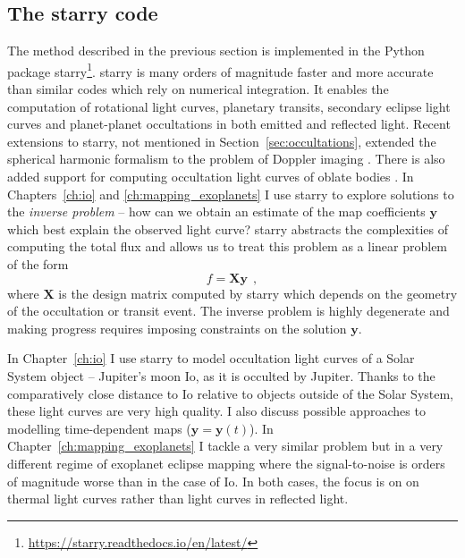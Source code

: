 \documentclass[12pt,dvipsnames]{report}
\newcommand{\ssf}[1]{\textsf{#1}}
\newcommand{\hquad}{~~}
\begin{document}
\subsection{The starry code}
The method described in the previous section is implemented in the
\ssf{Python} package
\ssf{starry}\footnote{\url{https://starry.readthedocs.io/en/latest/}}.
\ssf{starry} is many orders of magnitude faster and more accurate than
similar codes which rely on numerical integration. It enables the computation of
rotational light curves, planetary transits, secondary eclipse light curves and
planet-planet occultations in both emitted and reflected light. Recent
extensions to \ssf{starry}, not mentioned in Section~\ref{sec:occultations},
extended the spherical harmonic formalism to the problem of Doppler imaging
\citep{2021arXiv211006271L}. There is also added support for computing occultation light
curves of oblate bodies \citep{2022ApJ...925..185D}. In
Chapters~\ref{ch:io} and \ref{ch:mapping_exoplanets} I 
use \ssf{starry} to explore solutions to the \emph{inverse problem} -- 
how can we obtain an estimate of the map coefficients $\mathbf{y}$ which best
explain the observed light curve? \ssf{starry} abstracts the complexities of
computing the total flux and allows us to treat this problem as a linear
problem of the form
\begin{equation}
    f = \mathbf{X}\mathbf{y}
    \hquad,
    \label{eq:starry_linear_model}
\end{equation}
where  $\mathbf{X}$ is the design matrix computed by \ssf{starry} which depends on the 
geometry of the occultation or transit event. The inverse problem is highly degenerate
and making progress requires imposing constraints on the solution
$\mathbf{y}$.

In Chapter~\ref{ch:io} I use \ssf{starry} to model occultation
light curves of a Solar System object -- Jupiter's moon Io, as it is occulted
by Jupiter. Thanks to the comparatively close distance to Io relative to
objects outside of the Solar System, these light curves are very high quality.
 I also discuss possible approaches to modelling
time-dependent maps ($\mathbf{y}=\mathbf{y}(t)$). 
In Chapter~\ref{ch:mapping_exoplanets} I tackle a very similar problem but in a
very different regime of exoplanet eclipse mapping where the signal-to-noise is
orders of magnitude worse than in the case of Io. In both cases, the focus is on 
on thermal light curves rather than light curves in reflected light.
\end{document}
